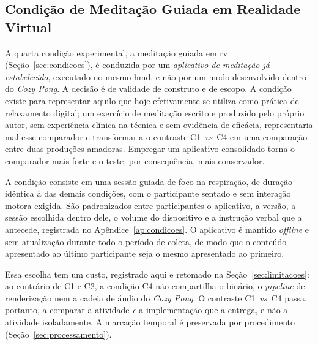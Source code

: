 
\subsection{Condição de Meditação Guiada em Realidade Virtual}\label{subsec:meditacao-vr}

A quarta condição experimental, a meditação guiada em \gls{rv} (Seção~\ref{sec:condicoes}), é conduzida por um \emph{aplicativo de meditação já estabelecido}, executado no mesmo \gls{hmd}, e não por um modo desenvolvido dentro do \textit{Cozy Pong}. A decisão é de validade de construto e de escopo. A condição existe para representar aquilo que hoje efetivamente se utiliza como prática de relaxamento digital; um exercício de meditação escrito e produzido pelo próprio autor, sem experiência clínica na técnica e sem evidência de eficácia, representaria mal esse comparador e transformaria o contraste C1~\textit{vs}~C4 em uma comparação entre duas produções amadoras. Empregar um aplicativo consolidado torna o comparador mais forte e o teste, por consequência, mais conservador.

A condição consiste em uma sessão guiada de foco na respiração, de duração idêntica à das demais condições, com o participante sentado e sem interação motora exigida. São padronizados entre participantes o aplicativo, a versão, a sessão escolhida dentro dele, o volume do dispositivo e a instrução verbal que a antecede, registrada no Apêndice~\ref{ap:condicoes}. O aplicativo é mantido \emph{offline} e sem atualização durante todo o período de coleta, de modo que o conteúdo apresentado ao último participante seja o mesmo apresentado ao primeiro.

Essa escolha tem um custo, registrado aqui e retomado na Seção~\ref{sec:limitacoes}: ao contrário de C1 e C2, a condição C4 não compartilha o binário, o \textit{pipeline} de renderização nem a cadeia de áudio do \textit{Cozy Pong}. O contraste C1~\textit{vs}~C4 passa, portanto, a comparar a atividade \emph{e} a implementação que a entrega, e não a atividade isoladamente. A marcação temporal é preservada por procedimento (Seção~\ref{sec:processamento}).



